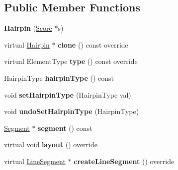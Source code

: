 \subsection*{Public Member Functions}
\begin{DoxyCompactItemize}
\item 
\mbox{\label{class_ms_1_1_hairpin_aab8aa7df746f3776f14a61fb5d8e6bfe}} 
{\bfseries Hairpin} (\hyperlink{class_ms_1_1_score}{Score} $\ast$s)
\item 
\mbox{\label{class_ms_1_1_hairpin_a200447444e72f86fb91b867addf4a3e9}} 
virtual \hyperlink{class_ms_1_1_hairpin}{Hairpin} $\ast$ {\bfseries clone} () const override
\item 
\mbox{\label{class_ms_1_1_hairpin_a917481c4a5acdf9dafbbf30abc8488d9}} 
virtual Element\+Type {\bfseries type} () const override
\item 
\mbox{\label{class_ms_1_1_hairpin_a941873a5c2f50c62be774e5d053316a8}} 
Hairpin\+Type {\bfseries hairpin\+Type} () const
\item 
\mbox{\label{class_ms_1_1_hairpin_a681bfb292784888abe60076c152def58}} 
void {\bfseries set\+Hairpin\+Type} (Hairpin\+Type val)
\item 
\mbox{\label{class_ms_1_1_hairpin_a4c25b71af0b356dd3288dc2d2917b224}} 
void {\bfseries undo\+Set\+Hairpin\+Type} (Hairpin\+Type)
\item 
\mbox{\label{class_ms_1_1_hairpin_a6f2d9c45f88e6acef3be4526c2cc3a3f}} 
\hyperlink{class_ms_1_1_segment}{Segment} $\ast$ {\bfseries segment} () const
\item 
\mbox{\label{class_ms_1_1_hairpin_a75f0378223d6621c92599addee209113}} 
virtual void {\bfseries layout} () override
\item 
\mbox{\label{class_ms_1_1_hairpin_adf41c96282a8a70e27d130e147620118}} 
virtual \hyperlink{class_ms_1_1_line_segment}{Line\+Segment} $\ast$ {\bfseries create\+Line\+Segment} () override
\item 

\end{DoxyCompactItemize}
